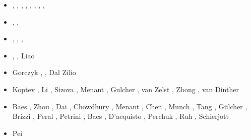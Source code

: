 \begin{itemize}
\begin{scriptsize}
\begin{itemize}
                            \cite{gery13}\cite{milp13},
                            \cite{rugb13}\cite{scdg13}
\item[\twothousandfourteen] \cite{dugs14}\cite{puge14},
                            \cite{voge14b}\cite{bagb14},
                            \cite{lige14}\cite{stjm14},
                            \cite{malg14}\cite{buge14},
                            \cite{gosk14}\cite{vamd14},
                            \cite{macg14}\cite{basc14},
                            \cite{gobg14}\cite{gery14},
                            \cite{gery14b}\cite{gita14},
                            \cite{sigb14}
\item[\twothousandfifteen] \cite{uewg15}\cite{rula15},
                           \cite{gesb15}\cite{rula15},
                           \cite{kocb15}\cite{hevg15}
\item[\twothousandsixteen] \cite{kobc16}\cite{magc16},
                           \cite{fige16}\cite{mauw16},
                           \cite{duay16}\cite{mesj16},
                           \cite{huwc16}\cite{staj16}
\item[\twothousandseventeen] \cite{mauw17}\cite{kocb17},
                             \cite{vomc17}\cite{shwl17}, 
                             Liao \etal \cite{liwg17}
\item[\twothousandeighteen] Gorczyk \etal \cite{gomb18}, \cite{zhlg18}
                            \cite{masg18}\cite{gebu18}
                            \cite{hegv18}, Dal Zilio \etal \cite{davg18}
\item[\twothousandnineteen] Koptev \etal \cite{kobg19}, Li \etal \cite{ligc19},
                      Sizova \etal \cite{sihf19}, Menant \etal \cite{meag19},
                      Gulcher \etal \cite{gubg19}, van Zelst \etal \cite{vawg19},
                      Zhong \etal \cite{zhli19}, van Dinther \etal \cite{vakf19}
\item[\twothousandtwenty] Baes \etal \cite{basg20}, Zhou \etal \cite{zhlg20}, 
                    Dai \etal \cite{dawl20}, Chowdhury \etal \cite{chcg20},
                    Menant \etal \cite{meag20}, Chen \etal \cite{chlc20}, Munch \etal \cite{mugu20}, 
                    Tang \etal \cite{tacm20}, G{\"u}lcher \etal \cite{gugm20}, Brizzi \etal \cite{brvf20}, 
                    Peral \etal \cite{perz20}, Petrini \etal \cite{pegy20}, 
                    Baes \etal \cite{basg20b}, D'acquisto \etal \cite{dadm20},
                    Perchuk \etal \cite{pegz20}, Ruh \cite{ruh20}, Schierjott \etal \cite{sctr20}
\item[\twothousandtwentyone]  Pei \etal \cite{pels21}
\end{itemize}
\end{scriptsize}



\end{itemize}
